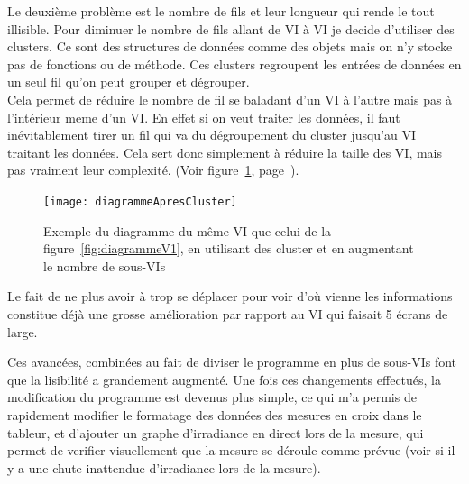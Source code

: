 \documentclass[12pt]{article}
\begin{document}
Le deuxième problème est le nombre de fils et leur longueur qui rende le tout illisible.
Pour diminuer le nombre de fils allant de VI à VI je decide d'utiliser des clusters.
Ce sont des structures de données comme des objets mais on n'y stocke pas de fonctions ou de méthode.
Ces clusters regroupent les entrées de données en un seul fil qu'on peut grouper et dégrouper.\\
Cela permet de réduire le nombre de fil se baladant d'un VI à l'autre mais pas à l'intérieur meme d'un VI.
En effet si on veut traiter les données, il faut inévitablement tirer un fil qui va du dégroupement du cluster jusqu'au VI traitant les données.
Cela sert donc simplement à réduire la taille des VI, mais pas vraiment leur complexité.
(Voir figure~\ref{fig:diagApresCluster}, page~\pageref{fig:diagApresCluster}).
\begin{figure}[h]
	\centering
	\texttt{[image: diagrammeApresCluster]}
	\caption{Exemple du diagramme du même VI que celui de la figure~\ref{fig:diagrammeV1}, en utilisant des cluster et en augmentant le nombre de sous-VIs}
	\label{fig:diagApresCluster}
\end{figure}
Le fait de ne plus avoir à trop se déplacer pour voir d'où vienne les informations constitue déjà une grosse amélioration par rapport au VI qui faisait 5 écrans de large.


Ces avancées, combinées au fait de diviser le programme en plus de sous-VIs font que la lisibilité a grandement augmenté.
Une fois ces changements effectués, la modification du programme est devenus plus simple, ce qui m'a permis de rapidement modifier le formatage des données des mesures en croix dans le tableur, et d'ajouter un graphe d'irradiance en direct lors de la mesure, qui permet de verifier visuellement que la mesure se déroule comme prévue (voir si il y a une chute inattendue d'irradiance lors de la mesure).
\end{document}
